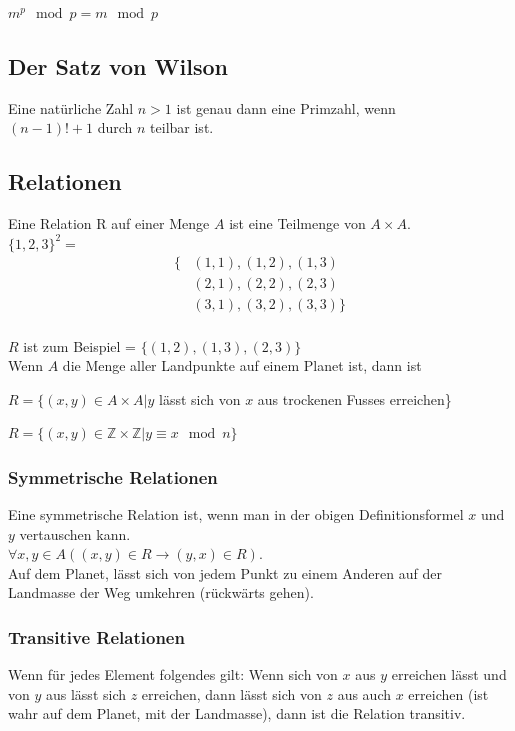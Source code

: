 \documentclass[12pt]{scrartcl}
\begin{document}
$m^p \mod p = m \mod p$\\


\subsection{Der Satz von Wilson}
Eine natürliche Zahl $n > 1$ ist genau dann eine Primzahl, wenn\\
$(n-1)! + 1$ durch $n$ teilbar ist.\\



\subsection{Relationen}
Eine Relation R auf einer Menge $A$ ist eine Teilmenge von $A \times A$.\\

$\{1,2,3\}^2 = $
\begin{align*}
    \{ &(1,1), (1,2), (1,3) \\
       &(2,1), (2,2), (2,3) \\
       &(3,1), (3,2), (3,3)\} \\
\end{align*}

$R$ ist zum Beispiel = $\{(1,2), (1,3), (2,3)\}$\\

Wenn $A$ die Menge aller Landpunkte auf einem Planet ist, dann ist

$R = \{(x,y) \in A \times A | y$ lässt sich von $x$ aus trockenen Fusses erreichen\}

$R = \{(x,y) \in \mathbb{Z} \times \mathbb{Z}|y \equiv x \mod n\}$


\subsubsection{Symmetrische Relationen}
Eine symmetrische Relation ist, wenn man in der obigen Definitionsformel $x$ und $y$ vertauschen kann.\\

$\forall x,y \in A((x,y) \in R \longrightarrow (y,x) \in R)$.\\

Auf dem Planet, lässt sich von jedem Punkt zu einem Anderen auf der Landmasse der Weg umkehren (rückwärts gehen).

\newpage
\subsubsection{Transitive Relationen}
Wenn für jedes Element folgendes gilt: Wenn sich von $x$ aus $y$ erreichen lässt und von $y$ aus lässt sich $z$ erreichen, 
dann lässt sich von $z$ aus auch $x$ erreichen (ist wahr auf dem Planet, mit der Landmasse), dann ist die Relation transitiv.\\
\end{document}
